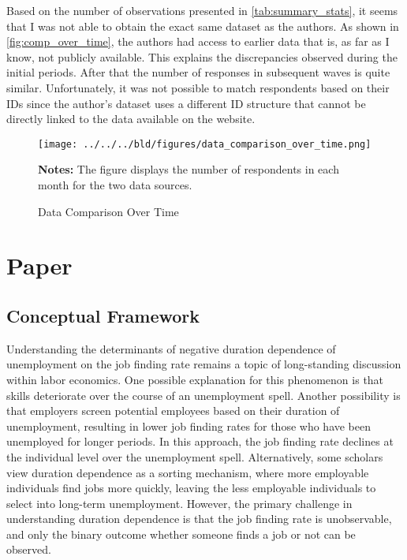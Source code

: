 \documentclass[11pt,a4paper,leqno]{article}
\begin{document}
Based on the number of observations presented in \autoref{tab:summary_stats}, it seems that I was not able to obtain the exact same dataset as the authors. As shown in \autoref{fig:comp_over_time}, the authors had access to earlier data that is, as far as I know, not publicly available. This explains the discrepancies observed during the initial periods. After that the number of responses in subsequent waves is quite similar. Unfortunately, it was not possible to match respondents based on their IDs since the author's dataset uses a different ID structure that cannot be directly linked to the data available on the website.

\begin{figure}[!htbp] \centering
	\texttt{[image: ../../../bld/figures/data\_comparison\_over\_time.png]}
	\begin{minipage}[center]{0.75\textwidth}
		\caption*{\footnotesize \textbf{Notes:} The figure displays the number of respondents in each month for the two data sources.}
	\end{minipage}
  \caption{Data Comparison Over Time}
\label{fig:comp_over_time}
\end{figure}

\section{Paper} \label{sec:paper}

\subsection*{Conceptual Framework}
Understanding the determinants of negative duration dependence of unemployment on the job finding rate remains a topic of long-standing discussion within labor economics.  One possible explanation for this phenomenon is that skills deteriorate over the course of an unemployment spell. Another possibility is that employers screen potential employees based on their duration of unemployment, resulting in lower job finding rates for those who have been unemployed for longer periods. In this approach, the job finding rate declines at the individual level over the unemployment spell. 
Alternatively, some scholars view duration dependence as a sorting mechanism, where more employable individuals find jobs more quickly, leaving the less employable individuals to select into long-term unemployment. However, the primary challenge in understanding duration dependence is that the job finding rate is unobservable, and only the binary outcome whether someone finds a job or not can be observed. 
\end{document}
